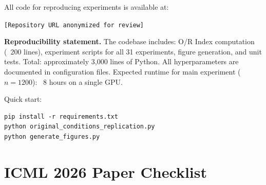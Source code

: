 \documentclass[twoside]{article}
\theoremstyle{remark}
\begin{document}
All code for reproducing experiments is available at:

\texttt{[Repository URL anonymized for review]}

\textbf{Reproducibility statement.} The codebase includes: O/R Index computation (~200 lines), experiment scripts for all 31 experiments, figure generation, and unit tests. Total: approximately 3,000 lines of Python. All hyperparameters are documented in configuration files. Expected runtime for main experiment ($n = 1200$): ~8 hours on a single GPU.

Quick start:
\begin{verbatim}
pip install -r requirements.txt
python original_conditions_replication.py
python generate_figures.py
\end{verbatim}

\section*{ICML 2026 Paper Checklist}
\end{document}
